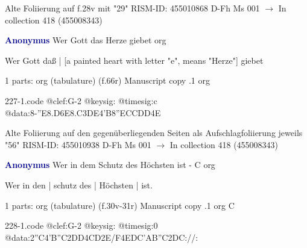 \documentclass[twocolumn]{book}
\begin{document}
\newline Alte Foliierung auf f.28v mit "29"
\newline RISM-ID: 455010868
\newline D-Fh  Ms 001
\newline $\rightarrow$ In collection 418 (455008343)
      
\newline \par \vspace{7pt} \textcolor{darkblue}{\textbf{Anonymus  }}
\newline Wer Gott das Herze giebet
\newline org
\newline \begin{itshape}[f.66r, at left:] Wer Gott daß | [a painted heart with letter "e", means "Herze"] giebet\end{itshape} 
\newline \textcolor{darkblue}{}  1 parts: org (tabulature)  (f.66r)
\newline Manuscript copy
.1  org  
\begin{filecontents*}{227-1.code}
@clef:G-2
@keysig:
@timesig:c
@data:8-{''E8.D6E}{8.C3DE}4'B{8''ECC}{DD}4E
\end{filecontents*}
\newline
%

\newline Alte Foliierung auf den gegenüberliegenden Seiten als Aufschlagfoliierung jeweils "56"
\newline RISM-ID: 455010938
\newline D-Fh  Ms 001
\newline $\rightarrow$ In collection 418 (455008343)
      
\newline \par \vspace{7pt} \textcolor{darkblue}{\textbf{Anonymus  }}
\newline Wer in dem Schutz des Höchsten ist - C
\newline org
\newline \begin{itshape}[f.30v, at left:] Wer in den | schutz des | Höchsten | ist.\end{itshape} 
\newline \textcolor{darkblue}{}  1 parts: org (tabulature)  (f.30v-31r)
\newline Manuscript copy
.1  org  C  
\begin{filecontents*}{228-1.code}
@clef:G-2
@keysig:
@timesig:0
@data:2''C4'B''C2DD4CD2E/F4EDC'AB''C2DC://:
\end{filecontents*}
\newline
%
\end{document}
